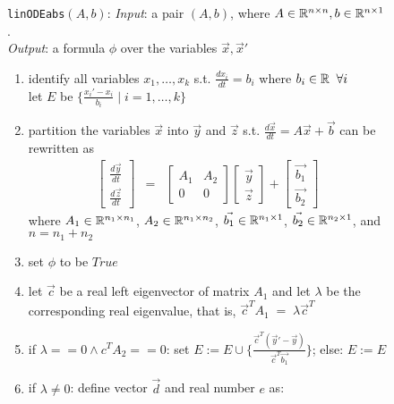 \documentclass{llncs}
\def\linODEabs{\tt{linODEabs}}
\begin{document}
\begin{figure}[htb!]
{\linODEabs}$(A,b)$:
{\em{Input}}: a pair $(A,b)$, where
$A\in\mathbb{R}^{n\times n}, b\in\mathbb{R}^{n\times 1}$.
\\
{\em{Output}}: a formula $\phi$ over the
variables $\vec{x},\vec{x}'$ 
\begin{enumerate}
\item
 identify all variables 
 $x_1, \ldots, x_k$ s.t. 
 $\frac{dx_i}{dt} = b_i$ where $b_i\in\mathbb{R}\;\;\forall{i}$
\\
 let $E$ be $\{\frac{x_i'-x_i}{b_i} \mid i=1,\ldots,k\}$
\item
 partition the variables $\vec{x}$ into $\vec{y}$ and $\vec{z}$ s.t.
 $\frac{d\vec{x}}{dt} = A\vec{x}+\vec{b}$ can be rewritten as
 \begin{eqnarray*}
  \left[ \begin{array}{c} \frac{d\vec{y}}{dt} \\ \frac{d\vec{z}}{dt} \end{array} \right]
  & = &
  \left[ \begin{array}{cc} A_1 & A_2 \\ 0 & 0 \end{array} \right]
  \left[ \begin{array}{c} \vec{y} \\ \vec{z} \end{array} \right] +
  \left[ \begin{array}{c} \vec{b_1} \\ \vec{b_2} \end{array} \right]
 \end{eqnarray*}
 where 
  $A_1 \in \mathbb{R}^{n_1\times n_1}$,
  $A_2 \in \mathbb{R}^{n_1\times n_2}$,
  $\vec{b_1} \in \mathbb{R}^{n_1\times 1}$, 
  $\vec{b_2} \in \mathbb{R}^{n_2\times 1}$, and $n = n_1 + n_2$
\item set $\phi$ to be $\mathit{True}$
\item\label{loop1head}
 let $\vec{c}$ be a real left eigenvector of matrix $A_1$ and
 let $\lambda$ be the corresponding real eigenvalue, that is,
  $\vec{c}^T A_1 \; = \; \lambda \vec{c}^T$
\item
 if $\lambda == 0\wedge c^TA_2 == 0$: set $E := E\cup \{ \frac{\vec{c}^T(\vec{y}'-\vec{y})}{\vec{c}^T\vec{b_1}} \}$; else: $E := E$
\item
 if $\lambda \neq 0$:
 define vector $\vec{d}$ and real number $e$ as:

\end{enumerate}
\end{figure}
\end{document}
